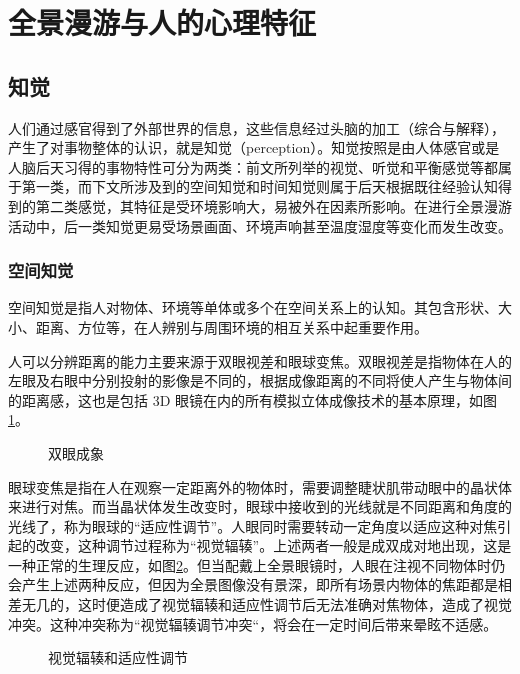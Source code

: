 \section{全景漫游与人的心理特征}

\subsection{知觉}
人们通过感官得到了外部世界的信息，这些信息经过头脑的加工（综合与解释），产生了对事物整体的认识，就是知觉（perception）。知觉按照是由人体感官或是人脑后天习得的事物特性可分为两类：前文所列举的视觉、听觉和平衡感觉等都属于第一类，而下文所涉及到的空间知觉和时间知觉则属于后天根据既往经验认知得到的第二类感觉，其特征是受环境影响大，易被外在因素所影响。在进行全景漫游活动中，后一类知觉更易受场景画面、环境声响甚至温度湿度等变化而发生改变。

\subsubsection{空间知觉}
空间知觉是指人对物体、环境等单体或多个在空间关系上的认知。其包含形状、大小、距离、方位等，在人辨别与周围环境的相互关系中起重要作用。

人可以分辨距离的能力主要来源于双眼视差和眼球变焦。双眼视差是指物体在人的左眼及右眼中分别投射的影像是不同的，根据成像距离的不同将使人产生与物体间的距离感，这也是包括 3D 眼镜在内的所有模拟立体成像技术的基本原理，如图\ref{fig:eyes}。

\begin{figure}[htp]
\centering
{}
\caption{双眼成象}
\label{fig:eyes}
\end{figure}

眼球变焦是指在人在观察一定距离外的物体时，需要调整睫状肌带动眼中的晶状体来进行对焦。而当晶状体发生改变时，眼球中接收到的光线就是不同距离和角度的光线了，称为眼球的“适应性调节”。人眼同时需要转动一定角度以适应这种对焦引起的改变，这种调节过程称为“视觉辐辏”。上述两者一般是成双成对地出现，这是一种正常的生理反应，如图\ref{fig:binocular_disparity}。但当配戴上全景眼镜时，人眼在注视不同物体时仍会产生上述两种反应，但因为全景图像没有景深，即所有场景内物体的焦距都是相差无几的，这时便造成了视觉辐辏和适应性调节后无法准确对焦物体，造成了视觉冲突。这种冲突称为“视觉辐辏调节冲突“，将会在一定时间后带来晕眩不适感。

\begin{figure}[htp]
\centering
{}
\caption{视觉辐辏和适应性调节}
\label{fig:binocular_disparity}
\end{figure}

